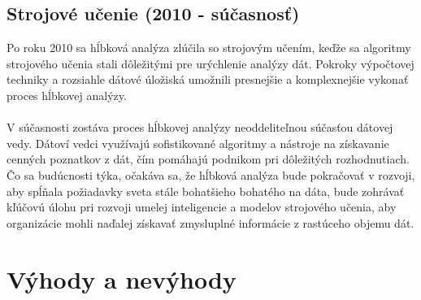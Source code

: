 \documentclass[10pt,twoside,slovak,a4paper]{article}
\begin{document}
\subsection{Strojové učenie (2010 - súčasnosť)}
Po roku 2010 sa hĺbková analýza zlúčila so strojovým učením, keďže sa algoritmy strojového učenia stali dôležitými pre urýchlenie analýzy dát. Pokroky výpočtovej techniky a rozsiahle dátové úložiská umožnili presnejšie a komplexnejšie vykonať proces hĺbkovej analýzy.
\\
\\
V súčasnosti zostáva proces hĺbkovej analýzy neoddeliteľnou súčasťou dátovej vedy. Dátoví vedci využívajú sofistikované algoritmy a nástroje na získavanie cenných poznatkov z dát, čím pomáhajú podnikom pri dôležitých rozhodnutiach. Čo sa budúcnosti týka, očakáva sa, že hĺbková analýza bude pokračovať v rozvoji, aby spĺňala požiadavky sveta stále bohatšieho bohatého na dáta, bude zohrávať kľúčovú úlohu pri rozvoji umelej inteligencie a modelov strojového učenia, aby organizácie mohli naďalej získavať zmysluplné informácie z rastúceho objemu dát.\cite{Majid:Evolution}

\section{Výhody a nevýhody}
\end{document}
